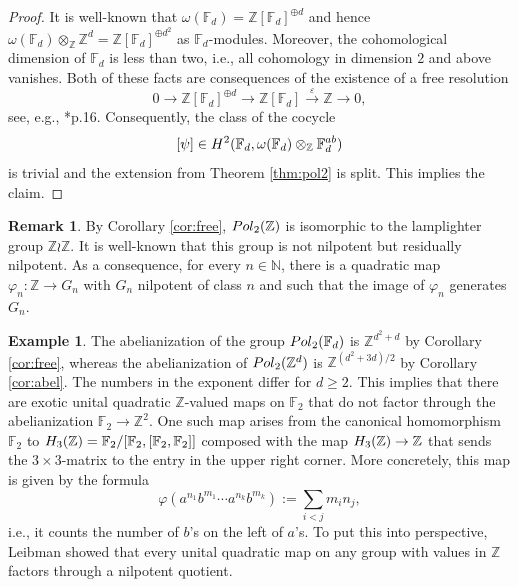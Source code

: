 \documentclass[a4paper,11pt]{amsproc}
\theoremstyle{plain}
\theoremstyle{definition}
\newtheorem{remark}[theorem]{Remark}
\newtheorem{example}[theorem]{Example}
\begin{document}
\begin{proof} It is well-known that $\omega(\mathbb F_d) = \mathbb Z[\mathbb F_d]^{\oplus d}$ and hence $\omega(\mathbb F_d) \otimes_{\mathbb Z} \mathbb Z^d = \mathbb Z[\mathbb F_d]^{\oplus d^2}$ as $\mathbb F_d$-modules. Moreover, the cohomological dimension of $\mathbb F_d$ is less than two, i.e., all cohomology in dimension $2$ and above vanishes. Both of these facts are consequences of the existence of a free resolution
$$0 \to \mathbb Z[\mathbb F_d]^{\oplus d} \to \mathbb Z[\mathbb F_d] \stackrel{\varepsilon}{\to} \mathbb Z \to 0,$$
see, e.g., \cite{MR1324339}*{p.16}. Consequently, the class of the cocycle $$[\psi] \in {\rm H}^2(\mathbb F_d, \omega(\mathbb F_d) \otimes_{\mathbb Z} \mathbb F_d^{ab})$$ is trivial and the extension from Theorem \ref{thm:pol2} is split. 
This implies the claim.
\end{proof}

\begin{remark}
By Corollary \ref{cor:free}, ${\rm Pol}_2(\mathbb Z)$ is isomorphic to the lamplighter group $\mathbb Z \wr \mathbb Z$. It is well-known that this group is not nilpotent but residually nilpotent. As a consequence, for every $n \in \mathbb N$, there is a quadratic map $\varphi_n \colon \mathbb Z \to G_n$ with $G_n$ nilpotent of class $n$ and such that the image of $\varphi_n$ generates $G_n$.
\end{remark}

\begin{example}
The abelianization of the group ${\rm Pol}_2(\mathbb F_d)$ is $\mathbb Z^{d^2+d}$ by Corollary \ref{cor:free}, whereas the abelianization of ${\rm Pol}_2(\mathbb Z^d)$ is $\mathbb Z^{(d^2+3d)/2}$ by Corollary \ref{cor:abel}. The numbers in the exponent differ for $d \geq 2.$ This implies that there are exotic unital quadratic $\mathbb Z$-valued maps on $\mathbb F_2$ that do not factor through the abelianization $\mathbb F_2 \to \mathbb Z^2.$ One such map arises from the canonical homomorphism $\mathbb F_2$ to ${\rm H}_3(\mathbb Z) = \mathbb F_2/[\mathbb F_2,[\mathbb F_2,\mathbb F_2]]$ composed with the map ${\rm H}_3(\mathbb Z) \to \mathbb Z$ that sends the $3\times 3$-matrix to the entry in the upper right corner. More concretely, this map is given by the formula
$$\varphi(a^{n_1}b^{m_1} \cdots a^{n_k}b^{m_k}):= \sum_{i<j} m_in_j,$$
i.e., it counts the number of $b$'s on the left of $a$'s. To put this into perspective, Leibman \cite{MR1910931} showed that every unital quadratic map on any group with values in $\mathbb Z$ factors through a nilpotent quotient. 
\end{example}
\end{document}
